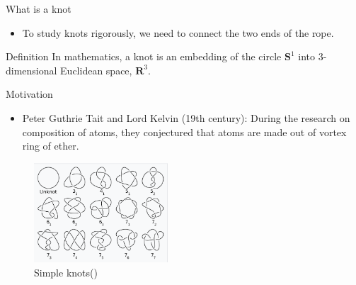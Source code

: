 \documentclass[]{beamer}
\begin{document}
\begin{frame}{What is a knot}
\begin{itemize}
    \item To study knots rigorously, we need to connect the two ends of the rope.
\end{itemize}
\begin{kulblock}{Definition}
    In mathematics, a knot is an embedding of the circle $\mathbf{S}^1$ into 3-dimensional Euclidean space, $\mathbf{R}^3$.
\end{kulblock}

\end{frame}

\begin{frame}{Motivation}
\begin{itemize}
    \item Peter Guthrie Tait and Lord Kelvin (19th century): During the research on composition of atoms, they conjectured that atoms are made out of vortex ring of ether.
\end{itemize}
\begin{figure}
    \centering
\includegraphics[width=5cm]{Pictures/simple knots.png}
    \caption{Simple knots(\cite{simpleknots})}
    \label{fig:enter-label}
\end{figure}

\end{frame}
\end{document}
